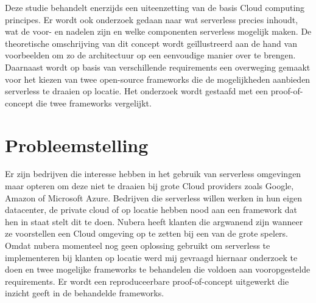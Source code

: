 Deze studie behandelt enerzijds een uiteenzetting van de basis Cloud computing principes. Er wordt ook onderzoek gedaan naar wat serverless precies inhoudt, wat de voor- en nadelen zijn en welke componenten serverless mogelijk maken. De theoretische omschrijving van dit concept wordt geïllustreerd aan de hand van voorbeelden om zo de architectuur op een eenvoudige manier over te brengen. Daarnaast wordt op basis van verschillende requirements een overweging gemaakt voor het kiezen van twee open-source frameworks die de mogelijkheden aanbieden serverless te draaien op locatie. Het onderzoek wordt gestaafd met een proof-of-concept die twee frameworks vergelijkt.


\section{Probleemstelling}
\label{sec:probleemstelling}


Er zijn bedrijven die interesse hebben in het gebruik van serverless omgevingen maar opteren om deze niet te draaien bij grote Cloud providers zoals Google, Amazon of Microsoft Azure. Bedrijven die serverless willen werken in hun eigen datacenter, de private cloud of op locatie hebben nood aan een framework dat hen in staat stelt dit te doen. Nubera heeft klanten die argwanend zijn wanneer ze voorstellen een Cloud omgeving op te zetten bij een van de grote spelers. Omdat nubera momenteel nog geen oplossing gebruikt om serverless te implementeren bij klanten op locatie werd mij gevraagd hiernaar onderzoek te doen en twee mogelijke frameworks te behandelen die voldoen aan vooropgestelde requirements. Er wordt een reproduceerbare proof-of-concept uitgewerkt die inzicht geeft in de behandelde frameworks.

